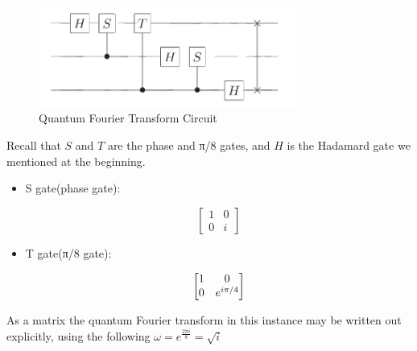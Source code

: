 \documentclass[inscr,ack,preface]{diphdthesis}
\begin{document}
\begin{figure}[ht]
\begin{center}
    \includegraphics[width=0.75\textwidth]{qft.png}
    \caption{Quantum Fourier Transform Circuit} 
    \label{fig:enter-label}
    \end{center}
\end{figure}

Recall that $S$ and $T$ are the phase and π/8 gates, and $H$ is the Hadamard gate we mentioned at the beginning.\cite{niel}

\begin{itemize}
    \item S gate(phase gate):
    \begin{center}
    \Large
        \[\begin{bmatrix}
            1 & 0 \\
            0 & i
        \end{bmatrix}\]
    \end{center}
    \normalsize
    \item T gate(π/8 gate):
    \begin{center}
    \Large
\[\begin{bmatrix}
    \Large
    1 & 0 \\
    0 & e^{i\pi/4}
    \end{bmatrix}\]    
    \end{center}
\end{itemize}
\normalsize

As a matrix the quantum Fourier transform in this instance may be written out explicitly, using the following  \Large$\omega= e^{\frac{2\pi i}{8}} = \sqrt{i}$ \normalsize \cite{niel}

\Large
\end{document}
